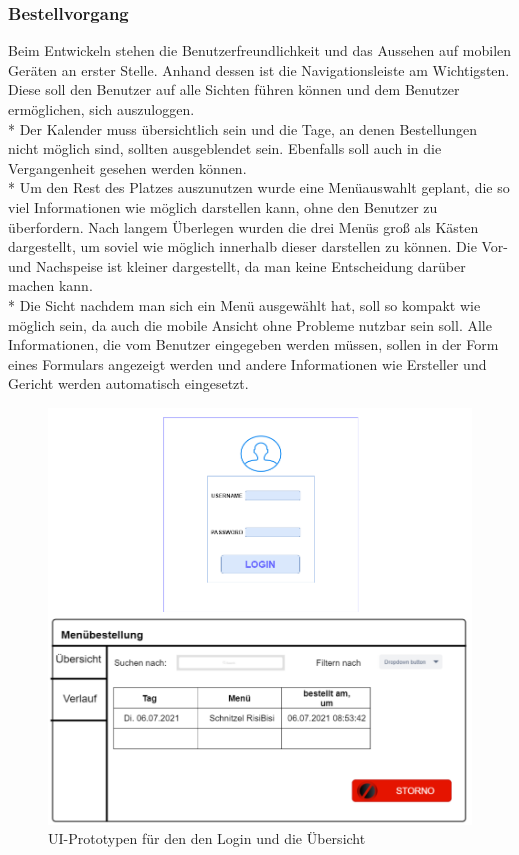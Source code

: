 \subsubsection{Bestellvorgang}
Beim Entwickeln stehen die Benutzerfreundlichkeit und das Aussehen auf mobilen Geräten an erster Stelle. Anhand dessen ist die Navigationsleiste am Wichtigsten.
Diese soll den Benutzer auf alle Sichten führen können und dem Benutzer ermöglichen, sich auszuloggen. \\*
Der Kalender muss übersichtlich sein und die Tage, an denen Bestellungen nicht möglich sind, sollten ausgeblendet sein. Ebenfalls soll auch in die Vergangenheit gesehen werden können.\\*
Um den Rest des Platzes auszunutzen wurde eine Menüauswahlt geplant, die so viel Informationen wie möglich  darstellen kann, ohne den Benutzer zu überfordern.
Nach langem Überlegen wurden die drei Menüs groß als Kästen dargestellt, um soviel wie möglich innerhalb dieser darstellen zu können.
Die Vor- und Nachspeise ist kleiner dargestellt, da man keine Entscheidung darüber machen kann.\\*
Die Sicht nachdem man sich ein Menü ausgewählt hat, soll so kompakt wie möglich sein, da auch die mobile Ansicht ohne Probleme nutzbar sein soll.
Alle Informationen, die vom Benutzer eingegeben werden müssen, sollen in der Form eines Formulars angezeigt werden und andere Informationen wie Ersteller und Gericht 
werden automatisch eingesetzt.
\begin{figure}[htp]
    \author{Benjamin Besic}
    \centering
    \includegraphics[scale=0.36]{pics/UI-Login-Uebersicht-Prototyp.png}
    \caption{UI-Prototypen für den den Login und die Übersicht}
    \label{fig:impl:UIPlanningLogUebersicht}
\end{figure}

